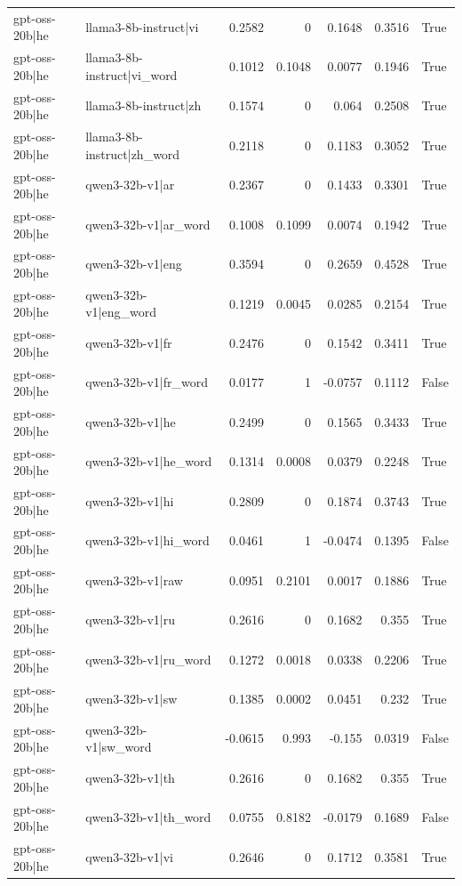 \begin{table}
\begin{tabular}{l l r r r r l}
gpt-oss-20b|he & llama3-8b-instruct|vi & 0.2582 & 0 & 0.1648 & 0.3516 & True \\
gpt-oss-20b|he & llama3-8b-instruct|vi_word & 0.1012 & 0.1048 & 0.0077 & 0.1946 & True \\
gpt-oss-20b|he & llama3-8b-instruct|zh & 0.1574 & 0 & 0.064 & 0.2508 & True \\
gpt-oss-20b|he & llama3-8b-instruct|zh_word & 0.2118 & 0 & 0.1183 & 0.3052 & True \\
gpt-oss-20b|he & qwen3-32b-v1|ar & 0.2367 & 0 & 0.1433 & 0.3301 & True \\
gpt-oss-20b|he & qwen3-32b-v1|ar_word & 0.1008 & 0.1099 & 0.0074 & 0.1942 & True \\
gpt-oss-20b|he & qwen3-32b-v1|eng & 0.3594 & 0 & 0.2659 & 0.4528 & True \\
gpt-oss-20b|he & qwen3-32b-v1|eng_word & 0.1219 & 0.0045 & 0.0285 & 0.2154 & True \\
gpt-oss-20b|he & qwen3-32b-v1|fr & 0.2476 & 0 & 0.1542 & 0.3411 & True \\
gpt-oss-20b|he & qwen3-32b-v1|fr_word & 0.0177 & 1 & -0.0757 & 0.1112 & False \\
gpt-oss-20b|he & qwen3-32b-v1|he & 0.2499 & 0 & 0.1565 & 0.3433 & True \\
gpt-oss-20b|he & qwen3-32b-v1|he_word & 0.1314 & 0.0008 & 0.0379 & 0.2248 & True \\
gpt-oss-20b|he & qwen3-32b-v1|hi & 0.2809 & 0 & 0.1874 & 0.3743 & True \\
gpt-oss-20b|he & qwen3-32b-v1|hi_word & 0.0461 & 1 & -0.0474 & 0.1395 & False \\
gpt-oss-20b|he & qwen3-32b-v1|raw & 0.0951 & 0.2101 & 0.0017 & 0.1886 & True \\
gpt-oss-20b|he & qwen3-32b-v1|ru & 0.2616 & 0 & 0.1682 & 0.355 & True \\
gpt-oss-20b|he & qwen3-32b-v1|ru_word & 0.1272 & 0.0018 & 0.0338 & 0.2206 & True \\
gpt-oss-20b|he & qwen3-32b-v1|sw & 0.1385 & 0.0002 & 0.0451 & 0.232 & True \\
gpt-oss-20b|he & qwen3-32b-v1|sw_word & -0.0615 & 0.993 & -0.155 & 0.0319 & False \\
gpt-oss-20b|he & qwen3-32b-v1|th & 0.2616 & 0 & 0.1682 & 0.355 & True \\
gpt-oss-20b|he & qwen3-32b-v1|th_word & 0.0755 & 0.8182 & -0.0179 & 0.1689 & False \\
gpt-oss-20b|he & qwen3-32b-v1|vi & 0.2646 & 0 & 0.1712 & 0.3581 & True \\

\end{tabular}
\end{table}
